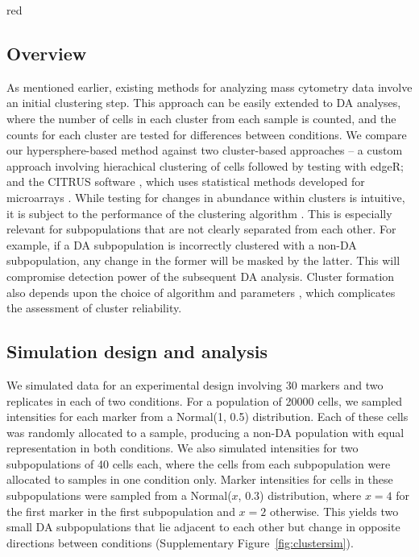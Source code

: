 \documentclass{article}
\begin{document}
\begin{color}{red}
\subsection{Overview}
As mentioned earlier, existing methods for analyzing mass cytometry data involve an initial clustering step.
This approach can be easily extended to DA analyses, where the number of cells in each cluster from each sample is counted, and the counts for each cluster are tested for differences between conditions.
We compare our hypersphere-based method against two cluster-based approaches -- a custom approach involving hierachical clustering of cells followed by testing with edgeR; and the CITRUS software \cite{bruggner2014automated}, which uses statistical methods developed for microarrays \cite{tusher2001significance}.
While testing for changes in abundance within clusters is intuitive, it is subject to the performance of the clustering algorithm \cite{kerr2001bootstrapping,ronan2016avoiding}.
This is especially relevant for subpopulations that are not clearly separated from each other.
For example, if a DA subpopulation is incorrectly clustered with a non-DA subpopulation, any change in the former will be masked by the latter.
This will compromise detection power of the subsequent DA analysis.
Cluster formation also depends upon the choice of algorithm and parameters \cite{datta2003comparisons,wiwie2015comparing}, which complicates the assessment of cluster reliability.

\subsection{Simulation design and analysis}
We simulated data for an experimental design involving 30 markers and two replicates in each of two conditions.
For a population of 20000 cells, we sampled intensities for each marker from a Normal(1, 0.5) distribution.
Each of these cells was randomly allocated to a sample, producing a non-DA population with equal representation in both conditions.
We also simulated intensities for two subpopulations of 40 cells each, where the cells from each subpopulation were allocated to samples in one condition only.
Marker intensities for cells in these subpopulations were sampled from a Normal($x$, 0.3) distribution, where $x=4$ for the first marker in the first subpopulation and $x=2$ otherwise.
This yields two small DA subpopulations that lie adjacent to each other but change in opposite directions between conditions (Supplementary Figure~\ref{fig:clustersim}).


\end{color}
\end{document}
